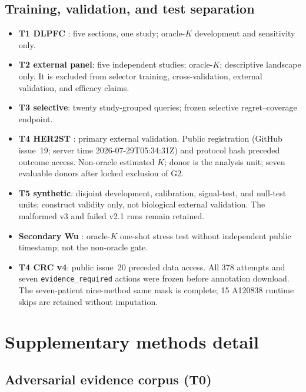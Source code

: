 \documentclass[11pt]{article}
\begin{document}
\subsection{Training, validation, and test separation}

\begin{itemize}
  \item \textbf{T1 DLPFC} \citep{maynard2021}: five sections, one study;
        oracle-\(K\) development and sensitivity only.
  \item \textbf{T2 external panel}: five independent studies; oracle-\(K\);
        descriptive landscape only. It is excluded from selector training,
        cross-validation, external validation, and efficacy claims.
  \item \textbf{T3 selective}: twenty study-grouped queries; frozen selective
        regret--coverage endpoint.
  \item \textbf{T4 HER2ST} \citep{andersson2021}: primary external validation.
        Public registration (GitHub issue~19; server time
        2026-07-29T05:34:31Z) and protocol hash preceded outcome access.
        Non-oracle estimated \(K\); donor is the analysis unit; seven evaluable
        donors after locked exclusion of G2.
  \item \textbf{T5 synthetic}: disjoint development, calibration, signal-test,
        and null-test units; construct validity only, not biological external
        validation. The malformed v3 and failed v2.1 runs remain retained.
  \item \textbf{Secondary Wu} \citep{wu2021}: oracle-\(K\) one-shot stress
        test without independent public timestamp; not the non-oracle gate.
  \item \textbf{T4 CRC v4}: public issue~20 preceded data access. All 378
        attempts and seven \texttt{evidence\_required} actions were frozen before
        annotation download. The seven-patient nine-method same mask is complete;
        15 A120838 runtime skips are retained without imputation.
\end{itemize}

\section{Supplementary methods detail}

\subsection{Adversarial evidence corpus (T0)}
\end{document}

